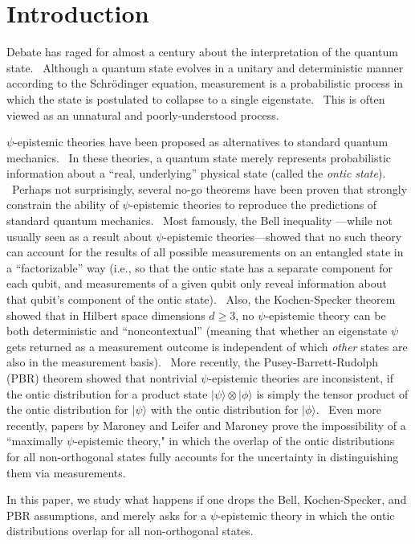 \documentclass[letterpaper,11pt]{article}
\begin{document}
\section{Introduction}

Debate has raged for almost a century about the interpretation of the
quantum state. \ Although a quantum state evolves in a unitary and
deterministic manner according to the Schr\"{o}dinger equation, measurement
is a probabilistic process in which the state is postulated to collapse to a
single eigenstate. \ This is often viewed as an unnatural and
poorly-understood process.

$\psi$-epistemic theories have been proposed as alternatives to standard quantum
mechanics. \ In these theories, a quantum state merely represents
probabilistic information about a ``real, underlying'' physical state
(called the \emph{ontic state}). \ Perhaps not surprisingly, several no-go theorems
have been proven that strongly constrain the ability of $\psi$-epistemic
theories to reproduce the predictions of standard quantum mechanics. \ Most
famously, the Bell inequality \cite{bell}---while not usually seen as a result about $\psi$-epistemic
theories---showed that no such theory can account for the results of all possible measurements on an entangled state in a
``factorizable'' way (i.e., so that the ontic state has a separate component for each qubit, and measurements of a given qubit only reveal information about that qubit's component of the ontic state). \ Also, the Kochen-Specker theorem \cite{ks} showed that in Hilbert space
dimensions $d\geq 3$, no $\psi$-epistemic theory can be both deterministic and
``noncontextual'' (meaning that whether an eigenstate $\psi$ gets returned
as a measurement outcome is independent of which \emph{other} states are
also in the measurement basis). \ More recently, the Pusey-Barrett-Rudolph
(PBR) theorem \cite{pbr} showed that nontrivial $\psi$-epistemic theories are inconsistent, if
the ontic distribution for a product state $| \psi \rangle \otimes %
 | \phi \rangle $ is simply the tensor product of the ontic
distribution for $ | \psi \rangle $ with the ontic distribution for
$ | \phi \rangle $. \ Even more recently, papers by Maroney \cite{mar} and Leifer and Maroney \cite{marleif} prove the impossibility of a ``maximally $\psi$-epistemic theory," in which the overlap of the ontic distributions for all non-orthogonal states fully accounts for the uncertainty in distinguishing them via measurements. \

In this paper, we study what happens
if one drops the Bell, Kochen-Specker, and PBR assumptions, and merely asks for a $\psi$-epistemic theory in which the ontic distributions overlap for all non-orthogonal states. \
\end{document}
